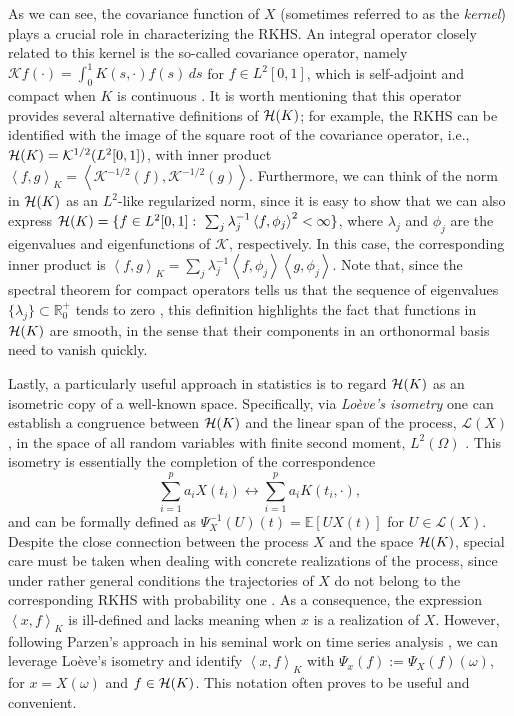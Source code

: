 \documentclass[ba]{imsart}
\numberwithin{equation}{section}
\theoremstyle{plain}
\newcommand{\R}{\mathbb{R}}
\newcommand{\E}{\mathbb{E}}
\newcommand{\Hcal}{\ensuremath\mathcal{H}}
\newcommand\dotprod[2]{\left\langle #1, #2 \right\rangle}
\begin{document}
As we can see, the covariance function of \(X\) (sometimes referred to as the \textit{kernel}) plays a crucial role in characterizing the RKHS. An integral operator closely related to this kernel is the so-called covariance operator, namely \(\mathcal Kf(\cdot) = \int_0^1 K(s, \cdot)f(s)\, ds\) for \(f \in L^2[0, 1]\), which is self-adjoint and compact when \(K\) is continuous \citep[e.g.][Th.~4.6.2]{hsing2015theoretical}. It is worth mentioning that this operator provides several alternative definitions of \(\Hcal(K)\); for example, the RKHS can be identified with the image of the square root of the covariance operator, i.e., \(\Hcal(K) = \mathcal K^{1/2}(L^2[0, 1])\), with inner product \(\dotprod{f}{g}_K = \dotprod{\mathcal K^{-1/2}(f)}{\mathcal K^{-1/2}(g)}\). Furthermore, we can think of the norm in \(\Hcal(K)\) as an \(L^2\)-like regularized norm, since it is easy to show that we can also express \(\Hcal(K) = \{f \in L^2[0, 1]: \ \sum_j \lambda_j^{-1}\dotprod{f}{\phi_j}^2 < \infty \}\), where \(\lambda_j\) and \(\phi_j\) are the eigenvalues and eigenfunctions of \(\mathcal K\), respectively. In this case, the corresponding inner product is \(\dotprod{f}{g}_K = \sum_j \lambda_j^{-1}\dotprod{f}{\phi_j}\dotprod{g}{\phi_j}\). Note that, since the spectral theorem for compact operators tells us that the sequence of eigenvalues \(\{\lambda_j\}\subset \R^+_0\) tends to zero \citep[e.g.][Th.~4.2.4]{hsing2015theoretical}, this definition highlights the fact that functions in \(\Hcal(K)\) are smooth, in the sense that their components in an orthonormal basis need to vanish quickly.

Lastly, a particularly useful approach in statistics is to regard \(\Hcal(K)\) as an isometric copy of a well-known space. Specifically, via \textit{Loève's isometry} one can establish a congruence between \(\Hcal(K)\) and the linear span of the process, \(\mathcal L(X)\), in the space of all random variables with finite second moment, \(L^2(\Omega)\) \citep[see Lemma 1.1 in][]{lukic2001stochastic}. This isometry is essentially the completion of the correspondence
  \[
  \sum_{i=1}^p a_i X(t_i) \longleftrightarrow \sum_{i=1}^p a_i K(t_i, \cdot),
\]
and can be formally defined as \(\Psi^{-1}_X(U)(t) = \E[U X(t)]\) for \(U \in \mathcal L(X)\).
Despite the close connection between the process \(X\) and the space \(\Hcal(K)\), special care must be taken when dealing with concrete realizations of the process, since under rather general conditions the trajectories of \(X\) do not belong to the corresponding RKHS with probability one \citep[see for example][Cor.~7.1]{lukic2001stochastic}. As a consequence, the expression \(\dotprod{x}{f}_K\) is ill-defined and lacks meaning when \(x\) is a realization of \(X\). However, following Parzen's approach in his seminal work on time series analysis \citep[Th.~4E]{parzen1961approach}, we can leverage Loève's isometry and identify \(\dotprod{x}{f}_K \) with \( \Psi_x(f) := \Psi_X(f)(\omega)\), for \(x=X(\omega)\) and \(f\in \Hcal(K)\). This notation often proves to be useful and convenient.
\end{document}
